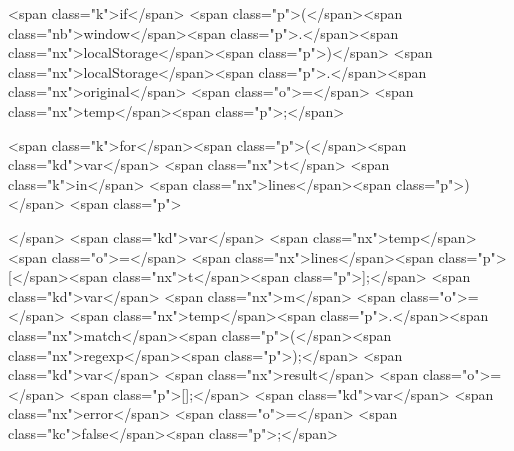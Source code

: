 \begin{rawhtml}
{  <span class="k">if</span> <span class="p">(</span><span class="nb">window</span><span class="p">.</span><span class="nx">localStorage</span><span class="p">)</span> <span class="nx">localStorage</span><span class="p">.</span><span class="nx">original</span>  <span class="o">=</span> <span class="nx">temp</span><span class="p">;</span>
  
  <span class="k">for</span><span class="p">(</span><span class="kd">var</span> <span class="nx">t</span> <span class="k">in</span> <span class="nx">lines</span><span class="p">)</span> <span class="p">{</span>
    <span class="kd">var</span> <span class="nx">temp</span> <span class="o">=</span> <span class="nx">lines</span><span class="p">[</span><span class="nx">t</span><span class="p">];</span>
    <span class="kd">var</span> <span class="nx">m</span> <span class="o">=</span> <span class="nx">temp</span><span class="p">.</span><span class="nx">match</span><span class="p">(</span><span class="nx">regexp</span><span class="p">);</span>
    <span class="kd">var</span> <span class="nx">result</span> <span class="o">=</span> <span class="p">[];</span>
    <span class="kd">var</span> <span class="nx">error</span> <span class="o">=</span> <span class="kc">false</span><span class="p">;</span>
    
}}
\end{rawhtml}
